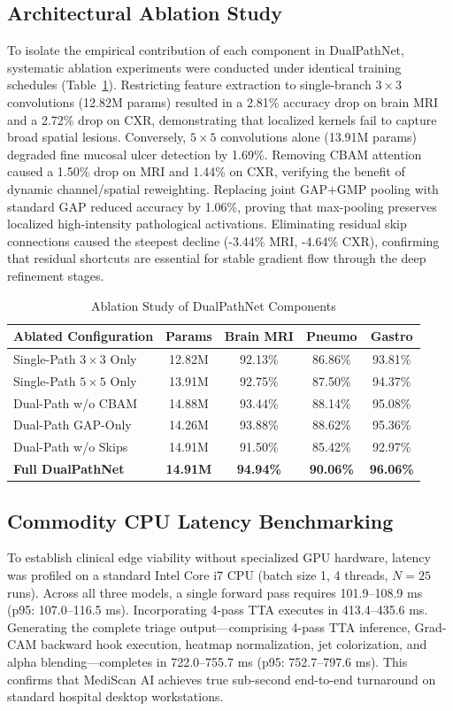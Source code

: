 \documentclass[conference]{IEEEtran}
\begin{document}
\subsection{Architectural Ablation Study}
To isolate the empirical contribution of each component in DualPathNet, systematic ablation experiments were conducted under identical training schedules (Table~\ref{tab:ablation}). Restricting feature extraction to single-branch $3\times 3$ convolutions (12.82M params) resulted in a 2.81\% accuracy drop on brain MRI and a 2.72\% drop on CXR, demonstrating that localized kernels fail to capture broad spatial lesions. Conversely, $5\times 5$ convolutions alone (13.91M params) degraded fine mucosal ulcer detection by 1.69\%. Removing CBAM attention caused a 1.50\% drop on MRI and 1.44\% on CXR, verifying the benefit of dynamic channel/spatial reweighting. Replacing joint GAP+GMP pooling with standard GAP reduced accuracy by 1.06\%, proving that max-pooling preserves localized high-intensity pathological activations. Eliminating residual skip connections caused the steepest decline (-3.44\% MRI, -4.64\% CXR), confirming that residual shortcuts are essential for stable gradient flow through the deep refinement stages.

\begin{table}[t]
\caption{Ablation Study of DualPathNet Components}
\label{tab:ablation}
\centering
\begin{tabular}{lcccc}
\toprule
\textbf{Ablated Configuration} & \textbf{Params} & \textbf{Brain MRI} & \textbf{Pneumo} & \textbf{Gastro} \\
\midrule
Single-Path $3\times 3$ Only & 12.82M & 92.13\% & 86.86\% & 93.81\% \\
Single-Path $5\times 5$ Only & 13.91M & 92.75\% & 87.50\% & 94.37\% \\
Dual-Path w/o CBAM & 14.88M & 93.44\% & 88.14\% & 95.08\% \\
Dual-Path GAP-Only & 14.26M & 93.88\% & 88.62\% & 95.36\% \\
Dual-Path w/o Skips & 14.91M & 91.50\% & 85.42\% & 92.97\% \\
\textbf{Full DualPathNet} & \textbf{14.91M} & \textbf{94.94\%} & \textbf{90.06\%} & \textbf{96.06\%} \\
\bottomrule
\end{tabular}
\end{table}

\subsection{Commodity CPU Latency Benchmarking}
To establish clinical edge viability without specialized GPU hardware, latency was profiled on a standard Intel Core i7 CPU (batch size 1, 4 threads, $N=25$ runs). Across all three models, a single forward pass requires 101.9–108.9 ms (p95: 107.0–116.5 ms). Incorporating 4-pass TTA executes in 413.4–435.6 ms. Generating the complete triage output---comprising 4-pass TTA inference, Grad-CAM backward hook execution, heatmap normalization, jet colorization, and alpha blending---completes in 722.0–755.7 ms (p95: 752.7–797.6 ms). This confirms that MediScan AI achieves true sub-second end-to-end turnaround on standard hospital desktop workstations.
\end{document}
